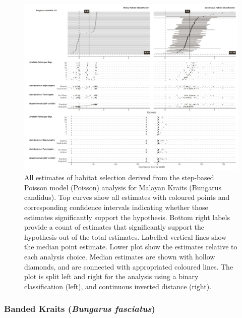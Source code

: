 \documentclass[10pt,a4paper]{article}
\begin{document}
\begin{figure}
\includegraphics[width=1\linewidth]{../../figures/specCurve_Bungarus candidus_pois} \caption{All estimates of habitat selection derived from the step-based Poisson model (Poisson) analysis for Malayan Kraits (Bungarus candidus). Top curves show all estimates with coloured points and corresponding confidence intervals indicating whether those estimates significantly support the hypothesis. Bottom right labels provide a count of estimates that significantly support the hypothesis out of the total estimates. Labelled vertical lines show the median point estimate. Lower plot show the estimates relative to each analysis choice. Median estimates are shown with hollow diamonds, and are connected with appropriated coloured lines. The plot is split left and right for the analysis using a binary classification (left), and continuous inverted distance (right).}\label{fig:specCurvePoisBUCA}
\end{figure}

\subsubsection{\texorpdfstring{Banded Kraits (\emph{Bungarus fasciatus})}{Banded Kraits (Bungarus fasciatus)}}\label{banded-kraits-bungarus-fasciatus}
\end{document}
